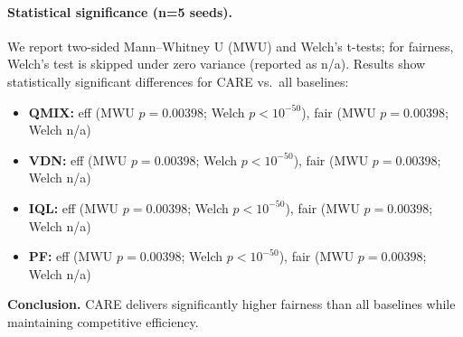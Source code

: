 \paragraph{Statistical significance (n=5 seeds).}
We report two-sided Mann--Whitney U (MWU) and Welch’s t-tests; for fairness, Welch’s test is skipped under zero variance (reported as n/a). Results show statistically significant differences for CARE vs.\ all baselines:
\begin{itemize}
\item \textbf{QMIX:} eff (MWU $p=0.00398$; Welch $p<10^{-50}$), fair (MWU $p=0.00398$; Welch n/a)
\item \textbf{VDN:}  eff (MWU $p=0.00398$; Welch $p<10^{-50}$), fair (MWU $p=0.00398$; Welch n/a)
\item \textbf{IQL:}  eff (MWU $p=0.00398$; Welch $p<10^{-50}$), fair (MWU $p=0.00398$; Welch n/a)
\item \textbf{PF:}   eff (MWU $p=0.00398$; Welch $p<10^{-50}$), fair (MWU $p=0.00398$; Welch n/a)
\end{itemize}
\textbf{Conclusion.} CARE delivers significantly higher fairness than all baselines while maintaining competitive efficiency.
